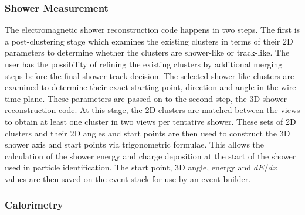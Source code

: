 \subsubsection{Shower Measurement}


The electromagnetic shower reconstruction code happens in two
steps. The first is a post-clustering stage which examines the
existing clusters in terms of their 2D parameters to determine whether
the clusters are shower-like or track-like. The user has the
possibility of refining the existing clusters by additional merging
steps before the final shower-track decision. The selected shower-like
clusters are examined to determine their exact starting point,
direction and angle in the wire-time plane. These parameters are
passed on to the second step, the 3D shower reconstruction code. At
this stage, the 2D clusters are matched between the views to obtain at
least one cluster in two views per tentative shower. These sets of 2D
clusters and their 2D angles and start points are then used to
construct the 3D shower axis and start points via trigonometric
formulae. This allows the calculation of the shower energy and charge
deposition at the start of the shower used in particle
identification. The start point, 3D angle, energy and $dE/dx$ values
are then saved on the event stack for use by an event builder.

\subsubsection{Calorimetry}


